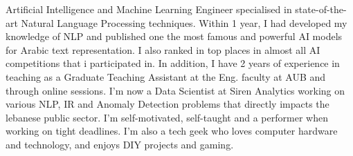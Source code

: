 

\begin{cvparagraph}

Artificial Intelligence and Machine Learning Engineer specialised in state-of-the-art Natural Language Processing techniques.
Within 1 year, I had developed my knowledge of NLP and published one the most famous and powerful AI models for Arabic text representation.
I also ranked in top places in almost all AI competitions that i participated in.
In addition, I have 2 years of experience in teaching as a Graduate Teaching Assistant at the Eng. faculty at AUB and through online sessions.
I'm now a Data Scientist at Siren Analytics working on various NLP, IR and Anomaly Detection problems that directly impacts the lebanese public sector.
I’m self-motivated, self-taught and a performer when working on tight deadlines. I’m also a tech geek who loves computer hardware and technology, and enjoys DIY projects and gaming.
\end{cvparagraph}
